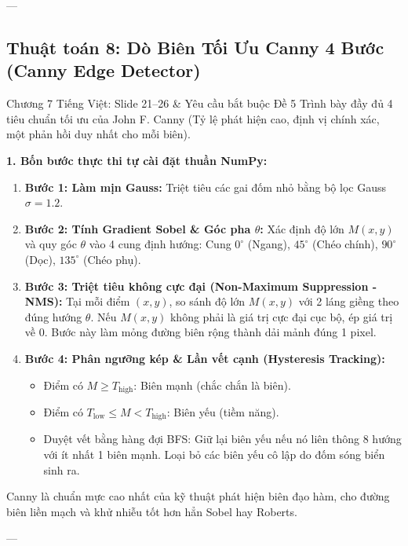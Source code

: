 \documentclass[11pt,a4paper]{article}
\begin{document}
---

\subsection{Thuật toán 8: Dò Biên Tối Ưu Canny 4 Bước (Canny Edge Detector)}
\begin{slidemapping}{Chương 7 Tiếng Việt: Slide 21--26 \& Yêu cầu bắt buộc Đề 5}
Trình bày đầy đủ 4 tiêu chuẩn tối ưu của John F. Canny (Tỷ lệ phát hiện cao, định vị chính xác, một phản hồi duy nhất cho mỗi biên).
\end{slidemapping}

\textbf{1. Bốn bước thực thi tự cài đặt thuần NumPy:}
\begin{enumerate}
    \item \textbf{Bước 1: Làm mịn Gauss:} Triệt tiêu các gai đốm nhỏ bằng bộ lọc Gauss $\sigma = 1.2$.
    \item \textbf{Bước 2: Tính Gradient Sobel \& Góc pha $\theta$:} Xác định độ lớn $M(x, y)$ và quy góc $\theta$ vào 4 cung định hướng: Cung $0^\circ$ (Ngang), $45^\circ$ (Chéo chính), $90^\circ$ (Dọc), $135^\circ$ (Chéo phụ).
    \item \textbf{Bước 3: Triệt tiêu không cực đại (Non-Maximum Suppression - NMS):}
    Tại mỗi điểm $(x, y)$, so sánh độ lớn $M(x, y)$ với 2 láng giềng theo đúng hướng $\theta$. Nếu $M(x, y)$ không phải là giá trị cực đại cục bộ, ép giá trị về 0. Bước này làm mỏng đường biên rộng thành dải mảnh đúng 1 pixel.
    \item \textbf{Bước 4: Phân ngưỡng kép \& Lần vết cạnh (Hysteresis Tracking):}
    \begin{itemize}
        \item Điểm có $M \ge T_{\text{high}}$: Biên mạnh (chắc chắn là biên).
        \item Điểm có $T_{\text{low}} \le M < T_{\text{high}}$: Biên yếu (tiềm năng).
        \item Duyệt vết bằng hàng đợi BFS: Giữ lại biên yếu nếu nó liên thông 8 hướng với ít nhất 1 biên mạnh. Loại bỏ các biên yếu cô lập do đốm sóng biển sinh ra.
    \end{itemize}
\end{enumerate}

\begin{whyuse}
Canny là chuẩn mực cao nhất của kỹ thuật phát hiện biên đạo hàm, cho đường biên liền mạch và khử nhiễu tốt hơn hẳn Sobel hay Roberts.
\end{whyuse}

---
\end{document}
